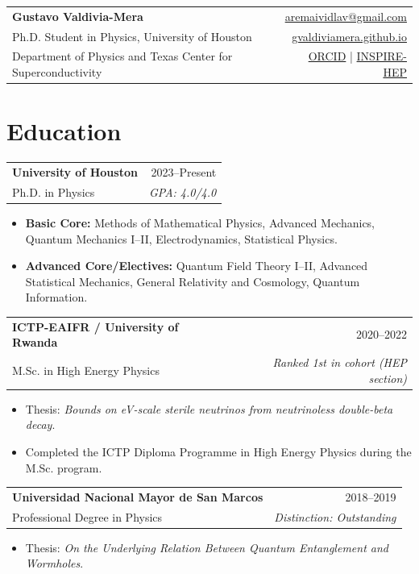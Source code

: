 \documentclass[10pt,a4paper]{article}
\makeatletter
\newcommand{\name}[1]{{\LARGE\bfseries #1}}
\newcommand{\role}[1]{{\normalsize\color{textgray} #1}}
\newcommand{\contact}[1]{{\small #1}}
\newcommand{\entry}[4]{%
  \begin{tabularx}{\textwidth}{@{}Y r@{}}
    \textbf{#1} & #2 \\
    #3 & \textit{#4}
  \end{tabularx}
}
\makeatother
\begin{document}
\begin{tabularx}{\textwidth}{@{}Y r@{}}
  \name{Gustavo Valdivia-Mera} &
  \contact{\href{mailto:aremaividlav@gmail.com}{aremaividlav@gmail.com}} \\
  \role{Ph.D. Student in Physics, University of Houston} &
  \contact{\href{https://gvaldiviamera.github.io}{gvaldiviamera.github.io}} \\
  \contact{Department of Physics and Texas Center for Superconductivity} &
  \contact{\href{https://orcid.org/0000-0002-8400-3625}{ORCID} \;|\;
  \href{https://inspirehep.net/authors/2875122?ui-citation-summary=true}{INSPIRE-HEP}}
\end{tabularx}

\vspace{3pt}

\section{Education}

\entry{University of Houston}{2023--Present}
{Ph.D. in Physics}{GPA: 4.0/4.0}
\begin{itemize}
  \item \textbf{Basic Core:} Methods of Mathematical Physics, Advanced Mechanics, Quantum Mechanics I--II, Electrodynamics, Statistical Physics.
  \item \textbf{Advanced Core/Electives:} Quantum Field Theory I--II, Advanced Statistical Mechanics, General Relativity and Cosmology, Quantum Information.
\end{itemize}

\entry{ICTP-EAIFR / University of Rwanda}{2020--2022}
{M.Sc. in High Energy Physics}{Ranked 1st in cohort (HEP section)}
\begin{itemize}
  \item Thesis: \textit{Bounds on eV-scale sterile neutrinos from neutrinoless double-beta decay}.
  \item Completed the ICTP Diploma Programme in High Energy Physics during the M.Sc. program.
\end{itemize}

\entry{Universidad Nacional Mayor de San Marcos}{2018--2019}
{Professional Degree in Physics}{Distinction: Outstanding}
\begin{itemize}
  \item Thesis: \textit{On the Underlying Relation Between Quantum Entanglement and Wormholes}.
\end{itemize}
\end{document}
